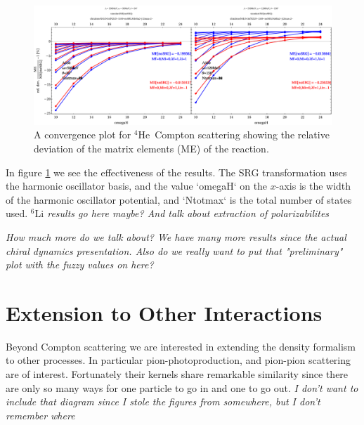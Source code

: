 \documentclass[a4paper,11pt]{article}
\newcommand{\LiS}{{}^{6} \mathrm{Li} }
\newcommand{\HeF}{{}^{4} \mathrm{He}}
\newcommand{\ques}[1]{\color{red}\textit{ #1 }\color{black}}
\begin{document}
\begin{figure}[h!]
  \begin{center}
    \includegraphics[width=\linewidth]{SRG-Converge-Double.pdf}
    \caption{A convergence plot for $\HeF$\, Compton scattering
    showing the relative deviation of the matrix elements (ME) of the reaction.}
    \label{fig:SRGConverge4He}
  \end{center}
\end{figure}
In figure \ref{fig:SRGConverge4He} we see the effectiveness of the results.
The SRG transformation uses the harmonic oscillator basis, and the
value `omegaH` on the $x$-axis is the width of the harmonic
oscillator potential, and `Ntotmax` is the total number of states
used.\ques{$\LiS$ results go here maybe? And talk about extraction of polarizabilites}

\ques{How much more do we talk about? We have many more results since
  the actual chiral dynamics presentation. Also do we really want to
put that "preliminary" plot with the fuzzy values on here?}
\section{Extension to Other Interactions}
Beyond Compton scattering we are interested in extending the density
formalism to other processes. In particular pion-photoproduction, and
pion-pion scattering are of interest.
Fortunately their kernels share remarkable similarity since there are
only so many ways for one particle to go in and one to go out.\ques{I
  don't want to include that diagram since I stole the figures from
somewhere, but I don't remember where}
\end{document}

